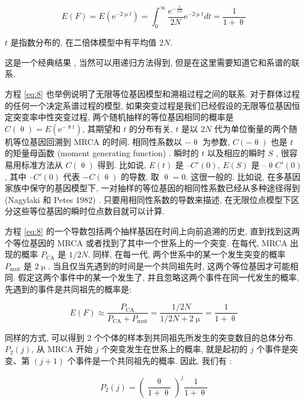 \documentclass[12pt]{article}
\begin{document}
\begin{equation} \label{eq:8}
    E(F) = E(\mathrm{e}^{-2\upmu t}) = \int_{0}^{\infty} \frac{\mathrm{e}^{-\frac{t}{2N}}}{2N}\mathrm{e}^{-2\upmu t} dt = \frac{1}{1+\uptheta}
\end{equation}

$t$ 是指数分布的, 在二倍体模型中有平均值 $2N$.

这是一个经典结果 \parencite{kimura1964}, 当然可以用递归方法得到, 但是在这里需要知道它和系谱的联系.

方程 \ref{eq:8} 也举例说明了无限等位基因模型和溯祖过程之间的联系. 对于群体过程的任何一个决定系谱过程的模型,
如果突变过程是我们已经假设的无限等位基因恒定突变率中性突变过程, 两个随机抽样的等位基因相同的概率是 $C(\uptheta
)=E(\mathrm{e}^{-\uptheta t})$, 其期望和 $t$ 的分布有关, $t$ 是以 $2N$ 代为单位衡量的两个随机等位基因回溯到 MRCA
的时间. 相同性系数以 $-\uptheta$ 为参数, $C(-\uptheta )$ 也是 $t$ 的矩量母函数 (moment generating function) .
瞬时的 $t$ 以及相应的瞬时 $S$ , 很容易用标准方法从 $C(\uptheta )$ 得到. 比如说, $E(t)$ 是 $–C'(0)$, $E(S)$ 是
$–\uptheta C'(0)$, 其中 $–C'(0)$ 代表 $-C(\uptheta )$ 的导数, 取 $\uptheta = 0$. 这很一般的. 比如说,
在多基因家族中保守的基因模型下, 一对抽样的等位基因的相同性系数已经从多种途径得到 (Nagylaki 和 Petes 1982) .
只要用相同性系数的导数来描述, 在无限位点模型下区分这些等位基因的瞬时位点数目就可以计算.

方程 \ref{eq:8} 的一个导数包括两个抽样基因在时间上向前追溯的历史, 直到找到这两个等位基因的 MRCA
或者找到了其中一个世系上的一个突变. 在每代, MRCA 出现的概率 $P_{\text{CA}}$ 是 $1/2N$. 同样, 在每一代,
两个世系中的某一个发生突变的概率 $P_{\text{mut}}$ 是 $2\upmu$. 当且仅当先遇到的时间是一个共同祖先时,
这两个等位基因才可能相同. 假定这两个事件中的某一个发生了, 并且忽略这两个事件在同一代发生的概率,
先遇到的事件是共同祖先的概率是:

\begin{equation} \label{eq:9}
    E(F) \approx \frac{P_{\text{CA}}}{P_{\text{CA}}+P_{\text{mut}}}=\frac{1/2N}{1/2N+2\upmu }=\frac{1}{1+\uptheta }
\end{equation}

同样的方式, 可以得到 2 个个体的样本到共同祖先所发生的突变数目的总体分布. $P_{2}(j)$, 从 MRCA 开始 $j$
个突变发生在世系上的概率, 就是起初的 $j$ 个事件是突变、第 $(j+1)$ 个事件是一个共同祖先的概率. 因此, 我们有
\parencite{watterson1975}:

\begin{equation} \label{eq:10}
    P_{2}(j)=\left (\frac{\uptheta}{1+\uptheta}\right )^{j}\frac{1}{1+\uptheta}
\end{equation}
\end{document}

